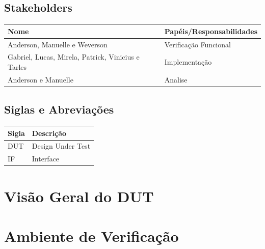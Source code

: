 \documentclass{article}
\begin{document}
	\subsection{Stakeholders}
  \FloatBarrier  
  \begin{table}[H] 
    \begin{center}
      \begin{tabular}[pos]{|m{5cm} | m{8cm}|} 
        \hline %
        \cellcolor[gray]{0.9}\textbf{Nome} & \cellcolor[gray]{0.9}\textbf{Papéis/Responsabilidades} \\ \hline
        Anderson, Manuelle e Weverson & Verificação Funcional \\ \hline
        Gabriel, Lucas, Mirela, Patrick, Vinicius e Tarles & Implementação \\ \hline
        Anderson e Manuelle & Analise \\ \hline       
      \end{tabular}
    \end{center}
  \end{table} 
  
  \subsection{Siglas e Abreviações}
  \FloatBarrier
  \begin{table}[H]
    \begin{center}
      \begin{tabular}[pos]{|m{2cm} | m{11cm}|} 
				\hline 
				\cellcolor[gray]{0.9}\textbf{Sigla} & \cellcolor[gray]{0.9}\textbf{Descrição} \\ \hline
				DUT		& Design Under Test \\ \hline
        IF    & Interface \\ \hline        
      \end{tabular}
    \end{center}
  \end{table}  

	\newpage
	\section{Visão Geral do DUT}

  	
	\newpage
	\section{Ambiente de Verificação}
	
\end{document}
